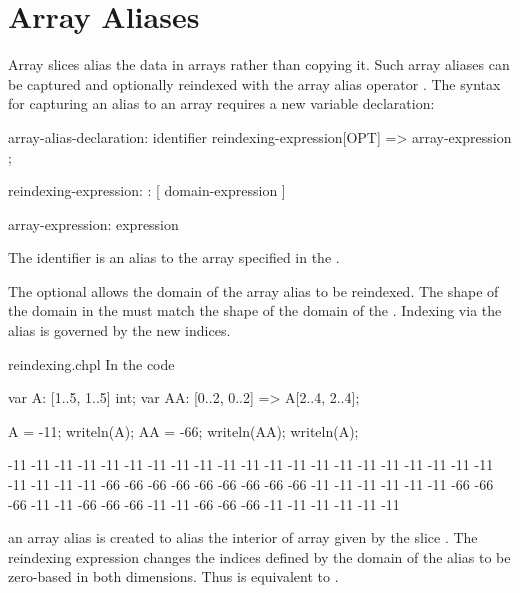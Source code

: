 %
%


\section{Array Aliases}
\label{Array_Aliases}

Array slices alias the data in arrays rather than copying it.  Such
array aliases can be captured and optionally reindexed with the array
alias operator \chpl{=>}.  The syntax for capturing an alias to an
array requires a new variable declaration:
\begin{syntax}
array-alias-declaration:
  identifier reindexing-expression[OPT] => array-expression ;

reindexing-expression:
  : [ domain-expression ]

array-expression:
  expression
\end{syntax}
The identifier is an alias to the array specified in
the .

The optional  allows the domain of the
array alias to be reindexed.  The shape of the domain in
the  must match the shape of the domain of
the .  Indexing via the alias is governed by
the new indices.

\begin{chapelexample}{reindexing.chpl}
In the code
\begin{chapel}
var A: [1..5, 1..5] int;
var AA: [0..2, 0..2] => A[2..4, 2..4];
\end{chapel}
\begin{chapelpost}
A = -11;
writeln(A);
AA = -66;
writeln(AA);
writeln(A);
\end{chapelpost}
\begin{chapeloutput}
-11 -11 -11 -11 -11
-11 -11 -11 -11 -11
-11 -11 -11 -11 -11
-11 -11 -11 -11 -11
-11 -11 -11 -11 -11
-66 -66 -66
-66 -66 -66
-66 -66 -66
-11 -11 -11 -11 -11
-11 -66 -66 -66 -11
-11 -66 -66 -66 -11
-11 -66 -66 -66 -11
-11 -11 -11 -11 -11
\end{chapeloutput}
an array alias  is created to alias the interior of
array  given by the slice .  The
reindexing expression changes the indices defined by the domain of the
alias to be zero-based in both dimensions.  Thus  is
equivalent to .
\end{chapelexample}

